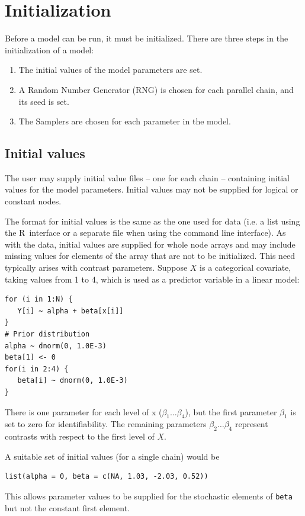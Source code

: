 \documentclass[11pt, a4paper, titlepage]{report}
\newcommand{\R}{\textsf{R}}
\begin{document}
\section{Initialization}

Before a model can be run, it must be initialized. There are three
steps in the initialization of a model:
\begin{enumerate}
\item The initial values of the model parameters are set.
\item A Random Number Generator (RNG) is chosen for each parallel chain,
  and its seed is set.
\item The Samplers are chosen for each parameter in the model. 
\end{enumerate}

\subsection{Initial values}

The user may supply initial value files -- one for each chain --
containing initial values for the model parameters. Initial values may
not be supplied for logical or constant nodes.

The format for initial values is the same as the one used for data
(i.e. a list using the \R\ interface or a separate file when using the
command line interface). As with the data, initial values are supplied
for whole node arrays and may include missing values for elements of
the array that are not to be initialized.  This need typically arises
with contrast parameters.  Suppose $X$ is a categorical covariate,
taking values from 1 to 4, which is used as a predictor variable in a
linear model:
\begin{verbatim}
for (i in 1:N) {
   Y[i] ~ alpha + beta[x[i]]
}
# Prior distribution
alpha ~ dnorm(0, 1.0E-3)
beta[1] <- 0
for(i in 2:4) {
   beta[i] ~ dnorm(0, 1.0E-3)
}
\end{verbatim}
There is one parameter for each level of x ($\beta_1 \ldots \beta_4$),
but the first parameter $\beta_1$ is set to zero for
identifiability. The remaining parameters $\beta_2 \ldots \beta_4$
represent contrasts with respect to the first level of $X$.

A suitable set of initial values (for a single chain) would be
\begin{verbatim}
list(alpha = 0, beta = c(NA, 1.03, -2.03, 0.52))
\end{verbatim}
This allows parameter values to be supplied for the stochastic
elements of \verb+beta+ but not the constant first element.
\end{document}
